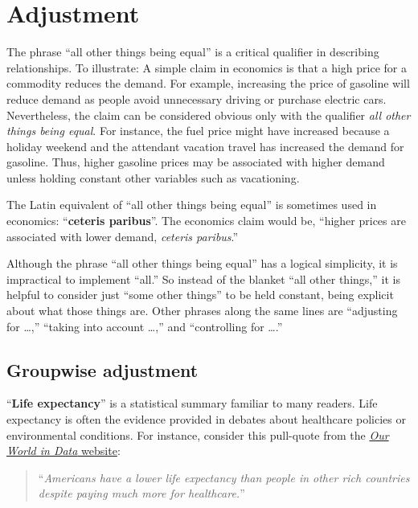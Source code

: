 \documentclass[
  letterpaper,
  DIV=11,
  numbers=noendperiod,
  oneside]{scrartcl}
\begin{document}
\newpage

\section{Adjustment}\label{sec-adjustment}

The phrase ``all other things being equal'' is a critical qualifier in
describing relationships. To illustrate: A simple claim in economics is
that a high price for a commodity reduces the demand. For example,
increasing the price of gasoline will reduce demand as people avoid
unnecessary driving or purchase electric cars. Nevertheless, the claim
can be considered obvious only with the qualifier \emph{all other things
being equal}. For instance, the fuel price might have increased because
a holiday weekend and the attendant vacation travel has increased the
demand for gasoline. Thus, higher gasoline prices may be associated with
higher demand unless holding constant other variables such as
vacationing.

The Latin equivalent of ``all other things being equal'' is sometimes
used in economics: ``\textbf{ceteris paribus}''. The economics claim
would be, ``higher prices are associated with lower demand,
\emph{ceteris paribus}.''

Although the phrase ``all other things being equal'' has a logical
simplicity, it is impractical to implement ``all.'' So instead of the
blanket ``all other things,'' it is helpful to consider just ``some
other things'' to be held constant, being explicit about what those
things are. Other phrases along the same lines are ``adjusting for
\ldots,'' ``taking into account \ldots,'' and ``controlling for
\ldots.''

\subsection{Groupwise adjustment}\label{groupwise-adjustment}

``\textbf{Life expectancy}'' is a statistical summary familiar to many
readers. Life expectancy is often the evidence provided in debates about
healthcare policies or environmental conditions. For instance, consider
this pull-quote from the
\href{https://ourworldindata.org/us-life-expectancy-low}{\emph{Our World
in Data} website}:

\begin{quote}
``\emph{Americans have a lower life expectancy than people in other rich
countries despite paying much more for healthcare.}''
\end{quote}
\end{document}

